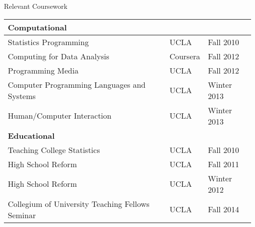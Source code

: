 \documentclass{resume} %
\begin{document}
\begin{rSection}{Relevant Coursework}
\begin{tabular}[c]{ lll}
\multicolumn{3}{l}{\bf Computational} \rule{0pt}{4ex}\\
\hline
Statistics Programming & UCLA & Fall 2010  \\
Computing for Data Analysis & Coursera & Fall 2012 \\
Programming Media & UCLA & Fall 2012 \\
Computer Programming Languages and Systems & UCLA & Winter 2013 \\
Human/Computer Interaction & UCLA & Winter 2013 \\
\multicolumn{3}{l}{\bf Educational} \rule{0pt}{4ex}\\
\hline
Teaching College Statistics & UCLA & Fall 2010 \\
High School Reform & UCLA & Fall 2011 \\
High School Reform & UCLA & Winter 2012 \\
Collegium of University Teaching Fellows Seminar & UCLA & Fall 2014
\end{tabular}
\end{rSection}
\end{document}
